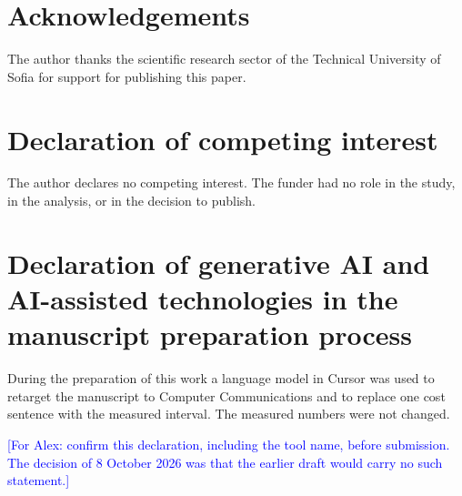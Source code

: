 \documentclass[preprint,number]{elsarticle}
\newif\ifsubmission
\newcommand{\ForAlex}[1]{\ifsubmission\PackageWarning{main}{a ForAlex note is left in the text}\else
  \textcolor{blue}{[For Alex: #1]}\fi}
\begin{document}
\section*{Acknowledgements}

The author thanks the scientific research sector of the Technical University of Sofia for support
for publishing this paper.

\section*{Declaration of competing interest}

The author declares no competing interest. The funder had no role in the study, in the analysis, or
in the decision to publish.

\section*{Declaration of generative AI and AI-assisted technologies in the manuscript preparation process}

During the preparation of this work a language model in Cursor was used to retarget the manuscript
to Computer Communications and to replace one cost sentence with the measured interval. The measured
numbers were not changed.
\ForAlex{confirm this declaration, including the tool name, before submission. The decision of
8 October 2026 was that the earlier draft would carry no such statement.}





\end{document}

